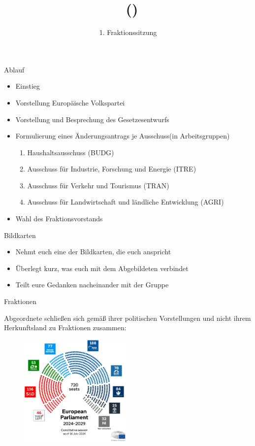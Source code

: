 \documentclass{beamer}
\title{\Fraktionsname\ (\Fraktionskuerzel)}
\subtitle{1. Fraktionssitzung}
\date{\datum}
\newcommand{\Fraktionsname}{Europäische Volkspartei}
\newcommand{\Fraktionsname}{Progressive Allianz der Sozialdemokraten}
\newcommand{\Fraktionsname}{Renew Europe}
\newcommand{\Fraktionsname}{Die Grünen/Europäische Freie Allianz}
\newcommand{\Fraktionsname}{Identität \& Demokratie}
\newcommand{\ausschuesse}{
   		     \begin{enumerate}
        		    \item Haushaltsausschuss (BUDG)
            		\item Ausschuss für Industrie, Forschung und Energie (ITRE)
    	    		    \item Ausschuss für Verkehr und Tourismus (TRAN)
    		        \item Ausschuss für Landwirtschaft und ländliche Entwicklung (AGRI)
	        \end{enumerate}
		}
\newcommand{\ausschuesse}{
            \begin{enumerate}
                \item Ausschuss für bürgerliche Freiheiten, Justiz und Inneres (LIBE)
                \item Ausschuss für Auswärtige Angelegenheiten (AFET)
                \item Unterausschuss für Menschenrechte (DROI)
            \end{enumerate}
    		}
\newcommand{\ausschuesse}{
            \begin{enumerate}
                \item Haushaltsausschuss (BUDG)
                \item Ausschuss für bürgerliche Freiheiten, Justiz und Inneres (LIBE)
                \item Unterausschuss für Sicherheit und Verteidigung (SEDE)
            \end{enumerate}
    		}
\begin{document}
\frame{\titlepage}

\begin{frame}{Ablauf}
\vspace{-1.5cm}
\begin{itemize}
    \item Einstieg
    \item Vorstellung \Fraktionsname
    \item Vorstellung und Besprechung des Gesetzesentwurfs
    \item Formulierung eines Änderungsantrags je Ausschuss\newline (in Arbeitsgruppen)
    \ausschuesse
    \item Wahl des Fraktionsvorstands
\end{itemize}
\end{frame}

\begin{frame}{Bildkarten}
\vspace{-1cm}
\begin{itemize}
    \item Nehmt euch eine der Bildkarten, die euch anspricht
    \item Überlegt kurz, was euch mit dem Abgebildeten verbindet
    \item Teilt eure Gedanken nacheinander mit der Gruppe
\end{itemize}
\end{frame}

\begin{frame}{Fraktionen}
\vspace{-0.5cm}
\begin{center}
    Abgeordnete schließen sich gemäß ihrer politischen Vorstellungen und nicht ihrem Herkunftsland zu Fraktionen zusammen:
\end{center}
\begin{figure}[h]
    \centering
    \includegraphics[height=5.5cm]{Bilder/EP_seats.jpg}
\end{figure}
\end{frame}
\end{document}
